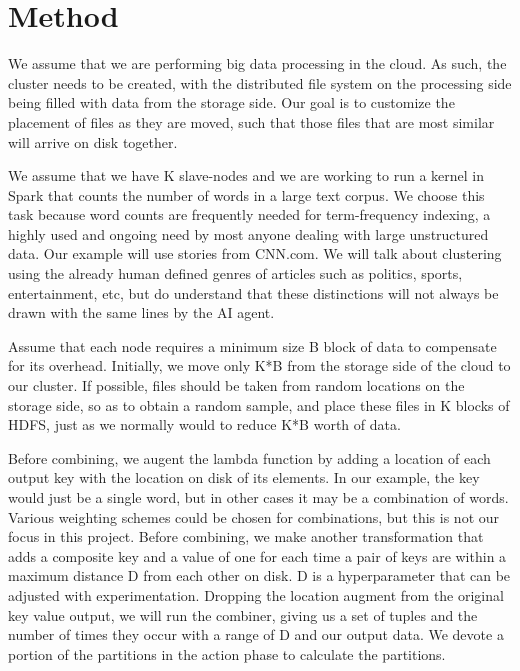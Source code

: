 \documentclass[12pt]{extarticle}
\begin{document}
\section{Method}
We assume that we are performing big data processing in the cloud.  As such, the cluster needs to be created, with the distributed file system on the processing side being filled with data from the storage side.  Our goal is to customize the placement of files as they are moved, such that those files that are most similar will arrive on disk together.  

We assume that we have K slave-nodes and we are working to run a kernel in Spark that counts the number of words in a large text corpus.  We choose this task because word counts are frequently needed for term-frequency indexing, a highly used and ongoing need by most anyone dealing with large unstructured data.  Our example will use stories from CNN.com.  We will talk about clustering using the already human defined genres of articles such as politics, sports, entertainment, etc, but do understand that these distinctions will not always be drawn with the same lines by the AI agent. 

Assume that each node requires a minimum size B block of data to compensate for its overhead.  Initially, we move only K*B from the storage side of the cloud to our cluster.  If possible, files should be taken from random locations on the storage side, so as to obtain a random sample, and place these files in K blocks of HDFS, just as we normally would to reduce K*B worth of data.  

Before combining, we augent the lambda function by adding a location of each output key with the location on disk of its elements.  In our example, the key would just be a single word, but in other cases it may be a combination of words.  Various weighting schemes could be chosen for combinations, but this is not our focus in this project.  Before combining, we make another transformation that adds a composite key and a value of one for each time a pair of keys are within a maximum distance D from each other on disk.  D is a hyperparameter that can be adjusted with experimentation.  Dropping the location augment from the original key value output, we will run the combiner, giving us a set of tuples and the number of times they occur with a range of D and our output data.  We devote a portion of the partitions in the action phase to calculate the partitions.  
\end{document}
